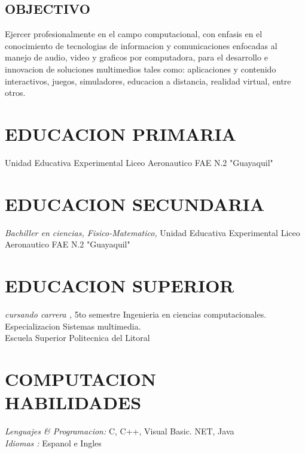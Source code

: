 \documentclass[margin]{res} %
\begin{document}
\begin{resume}

 
\subsection{OBJECTIVO}  

Ejercer profesionalmente en el campo computacional, con enfasis en el conocimiento de tecnologias de informacion y comunicaciones enfocadas al manejo de audio, video y graficos por computadora, para el desarrollo e innovacion de soluciones multimedios tales como: aplicaciones y contenido interactivos, juegos, simuladores, educacion a distancia, realidad virtual, entre otros.


\section{EDUCACION PRIMARIA}

Unidad Educativa Experimental Liceo Aeronautico FAE N.2 "Guayaquil"

\section{EDUCACION SECUNDARIA}

{\sl Bachiller en ciencias, Fisico-Matematico,} 
Unidad Educativa Experimental Liceo Aeronautico FAE N.2 "Guayaquil"

\section{EDUCACION SUPERIOR}

{\sl cursando carrera ,} 5to semestre Ingenieria en ciencias computacionales. Especializacion Sistemas multimedia. \\
Escuela Superior Politecnica del Litoral \\


\section{COMPUTACION \\ HABILIDADES} 

{\sl Lenguajes \& Programacion:} 
C, C++, Visual Basic. NET, Java \\
{\sl Idiomas :} 
Espanol e Ingles\\
 


\end{resume}
\end{document}
